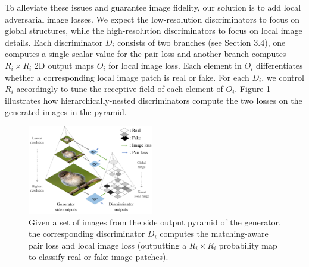 \documentclass[10pt,twocolumn,letterpaper]{article}
\begin{document}
To alleviate these issues and guarantee image fidelity, our solution is to add local adversarial image losses.
%
We expect the low-resolution discriminators to focus on global structures, while the high-resolution discriminators to focus  on local image details.
Each discriminator $D_i$ consists of two branches (see Section 3.4), one computes a single scalar value for the pair loss and another branch computes  $R_i{\times}R_i$ 2D output maps $O_i$ for local image loss.
Each element in $O_i$ differentiates whether a corresponding local image patch is real or fake.
For each $D_i$, we control $R_i$ accordingly to tune the receptive field of each element of $O_i$. 
Figure \ref{fig:loss} illustrates how hierarchically-nested discriminators compute the two losses on the generated images in the pyramid. 



\begin{figure}[t]
	\centering
	\includegraphics[width=0.49\textwidth]{figure/loss.pdf}
	\vspace{-.7cm}
	\caption{Given a set of images from the side output pyramid of the generator, the corresponding discriminator $D_i$ computes the matching-aware pair loss and local image loss (outputting a $R_i{\times}R_i$ probability map to classify real or fake image patches). }  \vspace{-.2cm}
	\label{fig:loss}
\end{figure}
\end{document}
